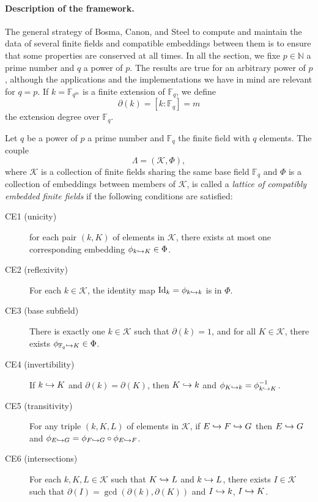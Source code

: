 \paragraph{Description of the framework.} The general strategy of Bosma, Canon,
and Steel to compute and maintain the data of several finite fields and
compatible embeddings between them is to ensure that some properties are
conserved at all times. In all the section, we fixe $p\in\mathbb{N}$ a prime
number and $q$ a power of $p$. The results are true for an arbitrary power of
$p$, although the applications and the implementations we have in mind are
relevant for $q=p$. If $k=\mathbb{F}_{q^m}$ is a finite extension of
$\mathbb{F}_q$, we define
\[
  \partial (k) = \left[ k:\mathbb{F}_q \right] = m
\]
the extension degree over $\mathbb{F}_q$.
\begin{defi}
  \label{defi:lattice-bcs}
  Let $q$ be a power of $p$ a prime number and $\mathbb{F}_q$ the finite field
  with $q$ elements. The couple
\[
  \Lambda = (\mathcal K, \Phi),
\]
where $\mathcal K$ is a collection of finite fields sharing the same base field
$\mathbb{F}_q$ and $\Phi$ is a collection of embeddings between members of
$\mathcal K$,
is called a \emph{lattice of compatibly embedded finite fields} if the following
conditions are satisfied:
\begin{description}
  \item[CE1 (unicity)] for each pair $(k, K)$ of elements in $\mathcal K$, there exists
    at most one corresponding embedding $\phi_{k\hookrightarrow K}\in\Phi$.
    \item[CE2 (reflexivity)] For each $k\in \mathcal K$, the identity map
    $\operatorname{Id}_k=\phi_{k\hookrightarrow k}$ is in $\Phi$.
  \item[CE3 (base subfield)] There is exactly one $k\in \mathcal K$ such that
    $\partial(k)=1$, and for all $K\in \mathcal K$, there exists $\phi_{\mathbb{F}_q\hookrightarrow K}\in\Phi$.
  \item[CE4 (invertibility)] If $k\hookrightarrow K$ and $\partial(k)=\partial(K)$, then $K\hookrightarrow k$ and
    $\phi_{K\hookrightarrow k}=\phi_{k\hookrightarrow K}^{-1}$.
  \item[CE5 (transitivity)] For any triple $(k, K, L)$ of elements in $\mathcal
    K$, if $E\hookrightarrow F\hookrightarrow G$ then $E\hookrightarrow G$ and
    $\phi_{E\hookrightarrow G}=\phi_{F\hookrightarrow G}\circ\phi_{E\hookrightarrow F}$.
  \item[CE6 (intersections)] For each $k, K, L\in \mathcal K$ such that $K\hookrightarrow L$ and
    $k\hookrightarrow L$, there exists $I\in \mathcal K$ such that
    $\partial(I)=\gcd(\partial(k), \partial(K))$
    and $I\hookrightarrow k$, $I\hookrightarrow K$.
\end{description}
\end{defi}

